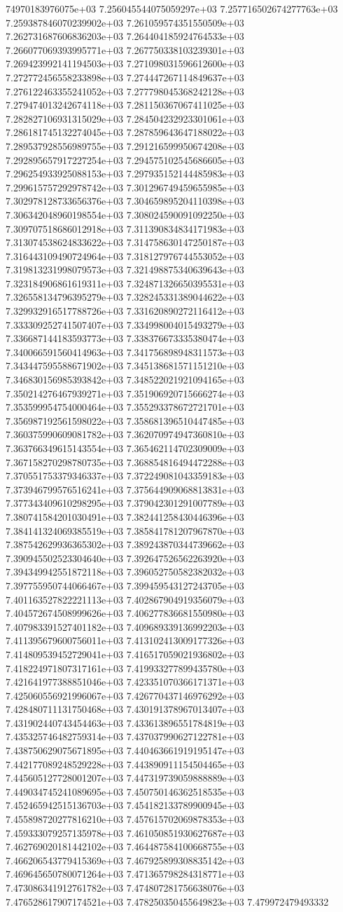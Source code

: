 74970183976075e+03	7.256045544075059297e+03	7.257716502674277763e+03	7.259387846070239902e+03	7.261059574351550509e+03	7.262731687606836203e+03	7.264404185924764533e+03	7.266077069393995771e+03	7.267750338103239301e+03	7.269423992141194503e+03	7.271098031596612600e+03	7.272772456558233898e+03	7.274447267114849637e+03	7.276122463355241052e+03	7.277798045368242128e+03	7.279474013242674118e+03	7.281150367067411025e+03	7.282827106931315029e+03	7.284504232923301061e+03	7.286181745132274045e+03	7.287859643647188022e+03	7.289537928556989755e+03	7.291216599950674208e+03	7.292895657917227254e+03	7.294575102545686605e+03	7.296254933925088153e+03	7.297935152144485983e+03	7.299615757292978742e+03	7.301296749459655985e+03	7.302978128733656376e+03	7.304659895204110398e+03	7.306342048960198554e+03	7.308024590091092250e+03	7.309707518686012918e+03	7.311390834834171983e+03	7.313074538624833622e+03	7.314758630147250187e+03	7.316443109490724964e+03	7.318127976744553052e+03	7.319813231998079573e+03	7.321498875340639643e+03	7.323184906861619311e+03	7.324871326650395531e+03	7.326558134796395279e+03	7.328245331389044622e+03	7.329932916517788726e+03	7.331620890272116412e+03	7.333309252741507407e+03	7.334998004015493279e+03	7.336687144183593773e+03	7.338376673335380474e+03	7.340066591560414963e+03	7.341756898948311573e+03	7.343447595588671902e+03	7.345138681571151210e+03	7.346830156985393842e+03	7.348522021921094165e+03	7.350214276467939271e+03	7.351906920715666274e+03	7.353599954754000464e+03	7.355293378672721701e+03	7.356987192561598022e+03	7.358681396510447485e+03	7.360375990609081782e+03	7.362070974947360810e+03	7.363766349615143554e+03	7.365462114702309009e+03	7.367158270298780735e+03	7.368854816494472288e+03	7.370551753379346337e+03	7.372249081043359183e+03	7.373946799576516241e+03	7.375644909068813831e+03	7.377343409610298295e+03	7.379042301291007789e+03	7.380741584201030491e+03	7.382441258430446396e+03	7.384141324069385519e+03	7.385841781207967870e+03	7.387542629936365302e+03	7.389243870344739662e+03	7.390945502523304640e+03	7.392647526562263920e+03	7.394349942551872118e+03	7.396052750582382032e+03	7.397755950744066467e+03	7.399459543127243705e+03	7.401163527822221113e+03	7.402867904919356079e+03	7.404572674508999626e+03	7.406277836681550980e+03	7.407983391527401182e+03	7.409689339136992203e+03	7.411395679600756011e+03	7.413102413009177326e+03	7.414809539452729041e+03	7.416517059021936802e+03	7.418224971807317161e+03	7.419933277899435780e+03	7.421641977388851046e+03	7.423351070366171371e+03	7.425060556921996067e+03	7.426770437146976292e+03	7.428480711131750468e+03	7.430191378967013407e+03	7.431902440743454463e+03	7.433613896551784819e+03	7.435325746482759314e+03	7.437037990627122781e+03	7.438750629075671895e+03	7.440463661919195147e+03	7.442177089248529228e+03	7.443890911154504465e+03	7.445605127728001207e+03	7.447319739059888889e+03	7.449034745241089695e+03	7.450750146362518535e+03	7.452465942515136703e+03	7.454182133789900945e+03	7.455898720277816210e+03	7.457615702069878353e+03	7.459333079257135978e+03	7.461050851930627687e+03	7.462769020181442102e+03	7.464487584100668755e+03	7.466206543779415369e+03	7.467925899308835142e+03	7.469645650780071264e+03	7.471365798284318771e+03	7.473086341912761782e+03	7.474807281756638076e+03	7.476528617907174521e+03	7.478250350455649823e+03	7.479972479493332